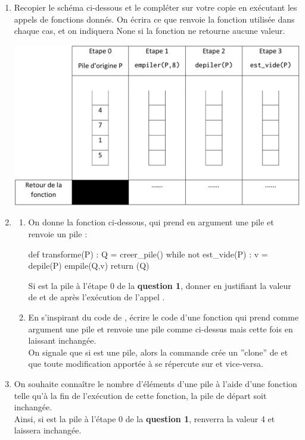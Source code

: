 \documentclass[11pt,a4paper,french,twoside]{PMCours}
\begin{document}
\begin{enumerate} 
    \item Recopier le schéma ci-dessous et le compléter sur votre copie en exécutant
    les appels de fonctions donnés. On écrira ce que renvoie la fonction utilisée
    dans chaque cas, et on indiquera None si la fonction ne retourne aucune
    valeur.
    \begin{center}
        \includegraphics[width=0.8\linewidth]{BacBlanc2Sujet1_NSI2122-img3.png}
    \end{center}
    \item \begin{enumerate}
    \item On donne la fonction ci-dessous, qui prend en argument une pile  et renvoie
    un pile  :
    \begin{Python}
    def transforme(P) :
        Q = creer_pile()
        while not est_vide(P) :
            v = depile(P)
            empile(Q,v)
        return (Q)
    \end{Python}
Si  est la pile à l'étape 0 de la {\bf question 1}, donner en justifiant la valeur de  et de  après l'exécution de l'appel  . 
    \item En s'inspirant du code de , écrire le code d'une fonction  qui prend comme argument une pile  et renvoie une pile  comme ci-dessus mais cette fois en laissant  inchangée.\medskip\\
On signale que si  est une pile, alors la commande  crée un ''clone'' de  et que toute modification apportée à  se répercute sur  et vice-versa.
 \end{enumerate}    
    \item On souhaite connaître le nombre d'éléments d'une pile à l'aide d'une fonction  telle qu'à la fin de l'exécution de cette fonction, la pile de départ soit inchangée.\\
Ainsi, si  est la pile à l'étape 0 de la {\bf question 1},  renverra la valeur 4 et laissera  inchangée.
   

\end{enumerate}
\end{document}

